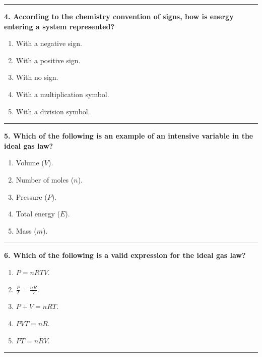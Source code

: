 \documentclass[
  9pt,
]{extbook}
\providecommand{\tightlist}{%
  \setlength{\itemsep}{0pt}\setlength{\parskip}{0pt}}
\theoremstyle{definition}
\theoremstyle{definition}
\theoremstyle{definition}
\theoremstyle{definition}
\theoremstyle{remark}
\begin{document}
\begin{center}\rule{0.5\linewidth}{0.5pt}\end{center}

\textbf{4. According to the chemistry convention of signs, how is energy entering a system represented?}

\begin{enumerate}
\def\labelenumi{\alph{enumi}.}
\tightlist
\item
  With a negative sign.
\item
  With a positive sign.
\item
  With no sign.
\item
  With a multiplication symbol.
\item
  With a division symbol.
\end{enumerate}

\begin{center}\rule{0.5\linewidth}{0.5pt}\end{center}

\textbf{5. Which of the following is an example of an intensive variable in the ideal gas law?}

\begin{enumerate}
\def\labelenumi{\alph{enumi}.}
\tightlist
\item
  Volume (\(V\)).
\item
  Number of moles (\(n\)).
\item
  Pressure (\(P\)).
\item
  Total energy (\(E\)).
\item
  Mass (\(m\)).
\end{enumerate}

\begin{center}\rule{0.5\linewidth}{0.5pt}\end{center}

\textbf{6. Which of the following is a valid expression for the ideal gas law?}

\begin{enumerate}
\def\labelenumi{\alph{enumi}.}
\tightlist
\item
  \(P=nRTV\).
\item
  \(\frac{P}{T}=\frac{nR}{V}\).
\item
  \(P+V=nRT\).
\item
  \(PVT=nR\).
\item
  \(PT=nRV\).
\end{enumerate}

\begin{center}\rule{0.5\linewidth}{0.5pt}\end{center}
\end{document}
